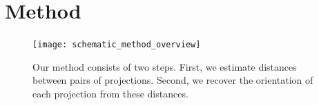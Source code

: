 \section{Method}



\begin{figure}
    \centering
    \texttt{[image: schematic\_method\_overview]}
    \caption{%
        Our method consists of two steps.
        First, we estimate distances between pairs of projections.
        Second, we recover the orientation of each projection from these distances.
    }\label{fig:schematic:method-overview}
\end{figure}

